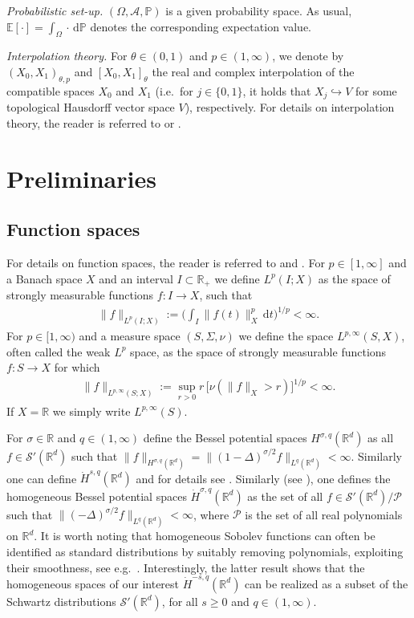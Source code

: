 \documentclass[reqno]{amsart}
\theoremstyle{plain}
\theoremstyle{remark}
\theoremstyle{plain}
\numberwithin{equation}{section}
\newcommand\bR{\mathbb{R}}
\renewcommand\P{\mathbb{P}}
\def\R{{\mathbb R}}
\newcommand{\E}{{\mathbb E}}
\renewcommand{\P}{{\mathbb P}}
\newcommand{\A}{{\mathcal A}}
\newcommand {\Schw}{\mathcal{S}}
\newcommand{\di}{\mathrm{d}}
\newcommand{\1}{\one}
\newcommand{\embed}{\hookrightarrow}
\renewcommand{\S}{\mathcal{S}}
\begin{document}
\emph{Probabilistic set-up.}  $(\Omega,\A,\P)$ is a given probability space. As usual, $\E[\cdot ]=\int_{\Omega} \cdot  \, \di \P$ denotes the corresponding expectation value.

\emph{Interpolation theory.} For $\theta\in (0,1)$ and $p\in (1,\infty)$, we denote by $(X_0,X_1)_{\theta,p}$ and $[X_0,X_1]_\theta$ the real and complex interpolation of the compatible spaces $X_0$ and $X_1$ (i.e.\ for $j\in \{0,1\}$, it holds that $X_j\embed V$ for some topological Hausdorff vector space $V$), respectively. For details on interpolation theory, the reader is referred to \cite{BeLo,InterpolationLunardi} or \cite[Appendix C]{HNVW1}.



\section{Preliminaries}
\label{sec: preliminaries}

\subsection{Function spaces}\label{subs:func}


For details on function spaces, the reader is referred to \cite{HNVW1} and \cite{Tri83,Tri95}. For $p\in [1,\infty]$ and a Banach space $X$ and an interval $I\subset\bR_+$ we define $L^p(I;X)$ as the space of strongly measurable functions $f:I\to X$, such that 
\begin{align}
    \|f\|_{L^p(I;X)}:=\Big( \int_I \|f(t)\|_{X}^p \,\di t\Big)^{1/p}<\infty.
\end{align}
For $p\in [1,\infty)$ and a measure space $(S,\Sigma,\nu)$ we define
the space $L^{p,\infty}(S,X)$, often called the weak $L^p$ space, as the space of strongly measurable functions $f:S\to X$ for which
\begin{align}
    \|f\|_{L^{p,\infty}(S;X)}:=\sup_{r>0}r\,\big[\nu(\|f\|_{X}>r)\big]^{1/p}<\infty.
\end{align}
If $X = \bR$ we simply write $L^{p,\infty}(S)$.

For $\sigma\in \R$ and $q\in (1, \infty)$ define the Bessel potential spaces $H^{\sigma,q}(\R^d)$ as all $f\in \Schw'(\R^d)$ such that $\|f\|_{H^{\sigma,q}(\R^d)} = \|(1-\Delta)^{\sigma/2} f\|_{L^q(\R^d)}<\infty$. 
Similarly one can define $\dot{H}^{s,q}(\R^d)$ and for details see \cite[Chapter 5]{Tri83}.
Similarly (see \cite[Subsection 1.3.3]{Grafakos2}), one defines the homogeneous
Bessel potential spaces $\dot{H}^{\sigma,q}(\R^d)$ as the set of all $f\in \S'(\R^d)/\mathcal{P}$ such that $\|(-\Delta)^{\sigma/2}f\|_{L^{q}(\R^d)}<\infty$, where $\mathcal{P}$ is the set of all real polynomials on $\R^d$. It is worth noting that homogeneous Sobolev functions can often be identified as standard distributions by suitably removing polynomials, exploiting their smoothness, see e.g.\ \cite[Theorem 2.31]{S18_Besov}. Interestingly, the latter result shows that the homogeneous spaces of our interest $\dot{H}^{-s,q}(\R^d)$ can be realized as a subset of the Schwartz distributions $ \S'(\R^d)$, for all $s\geq 0$ and $q\in (1,\infty)$. 
\end{document}
